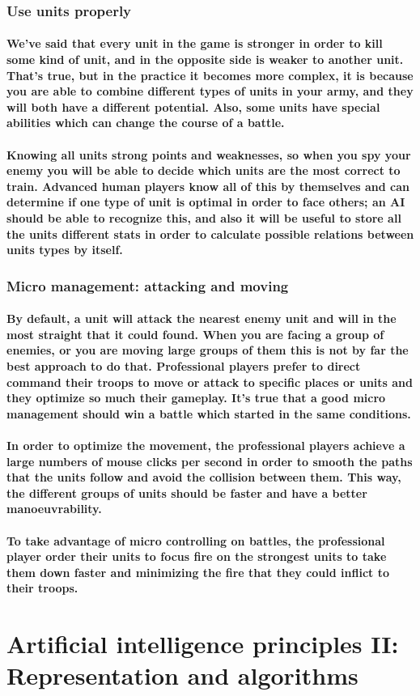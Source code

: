 \documentclass[a4paper,10pt]{article}
\newcommand{\p}[1]{\paragraph{\indent\textnormal{#1}}}
\begin{document}
  \subsubsection{Use units properly}

     \p{We've said that every unit in the game is stronger in order to kill some kind of unit, and in the opposite side is weaker to another unit. That's true, but in the practice it becomes more complex, it is because you are able to combine different types of units in your army, and they will both have a different potential. Also, some units have special abilities which can change the course of a battle.}

     \p{Knowing all units strong points and weaknesses, so when you spy your enemy you will be able to decide which units are the most correct to train. Advanced human players know all of this by themselves and can determine if one type of unit is optimal in order to face others; an AI should be able to recognize this, and also it will be useful to store all the units different stats in order to calculate possible relations between units types by itself.}

  \subsubsection{Micro management: attacking and moving}

    \p{By default, a unit will attack the nearest enemy unit and will in the most straight that it could found. When you are facing a group of enemies, or you are moving large groups of them this is not by far the best approach to do that. Professional players prefer to direct command their troops to move or attack to specific places or units and they optimize so much their gameplay. It's true that a good micro management should win a battle which started in the same conditions.}

    \p{In order to optimize the movement, the professional players achieve a large numbers of mouse clicks per second in order to smooth the paths that the units follow and avoid the collision between them. This way, the different groups of units should be faster and have a better manoeuvrability.}

    \p{To take advantage of micro controlling on battles, the professional player order their units to focus fire on the strongest units to take them down faster and minimizing the fire that they could inflict to their troops.}


\newpage
\section{Artificial intelligence principles II: Representation and algorithms}
\end{document}
